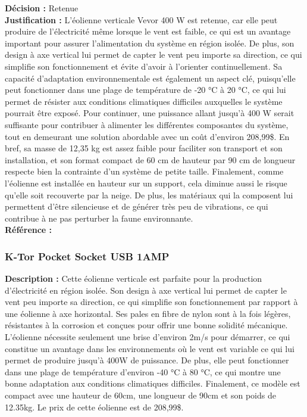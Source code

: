 \noindent
\textbf{Décision :} Retenue \\

\noindent
\textbf{Justification :} L’éolienne verticale Vevor 400 W est retenue, car elle peut
produire de l’électricité même lorsque le vent est faible, ce qui est un
avantage important pour assurer l’alimentation du système en région isolée. De
plus, son design à axe vertical lui permet de capter le vent peu importe sa
direction, ce qui simplifie son fonctionnement et évite d’avoir à l’orienter
continuellement. Sa capacité d’adaptation environnementale est également un
aspect clé, puisqu’elle peut fonctionner dans une plage de température de -20
°C à 20 °C, ce qui lui permet de résister aux conditions climatiques difficiles
auxquelles le système pourrait être exposé. Pour continuer, une puissance
allant jusqu’à 400 W serait suffisante pour contribuer à alimenter les
différentes composantes du système, tout en demeurant une solution abordable
avec un coût d’environ 208,99\$. En bref, sa masse de 12,35 kg est assez faible
pour faciliter son transport et son installation, et son format compact de 60
cm de hauteur par 90 cm de longueur respecte bien la contrainte d’un système de
petite taille. Finalement, comme l’éolienne est installée en hauteur sur un
support, cela diminue aussi le risque qu’elle soit recouverte par la neige. De
plus, les matériaux qui la composent lui permettent d’être silencieuse et de
générer très peu de vibrations, ce qui contribue à ne pas perturber la faune
environnante. \\

\noindent
\textbf{Référence :} \cite{30} \cite{31} \\

\subsubsection{K-Tor Pocket Socket USB 1AMP}

\noindent
\textbf{Description :} Cette éolienne verticale est parfaite pour la production
d’électricité en région isolée. Son design à axe vertical lui permet de capter
le vent peu importe sa direction, ce qui simplifie son fonctionnement par
rapport à une éolienne à axe horizontal. Ses pales en fibre de nylon sont à la
fois légères, résistantes à la corrosion et conçues pour offrir une bonne
solidité mécanique. L’éolienne nécessite seulement une brise d’environ 2m/s
pour démarrer, ce qui constitue un avantage dans les environnements où le vent
est variable ce qui lui permet de produire jusqu’à 400W de puissance. De plus,
elle peut fonctionner dans une plage de température d’environ -40 °C à 80 °C,
ce qui montre une bonne adaptation aux conditions climatiques difficiles.
Finalement, ce modèle est compact avec une hauteur de 60cm, une longueur de
90cm et son poids de 12.35kg. Le prix de cette éolienne est de 208,99\$. \\

